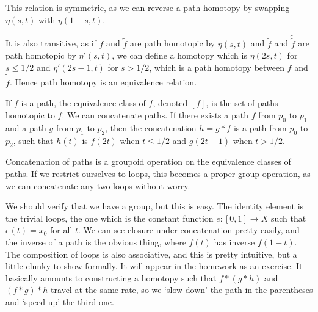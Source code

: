  This relation is symmetric, as we can reverse a path homotopy by swapping $\eta(s,t)$ with $\eta(1-s,t)$.
 
 It is also transitive, as if $f$ and $\tilde{f}$ are path homotopic by $\eta(s,t)$ and $\tilde{f}$ and $\tilde{\tilde{f}}$ are path homotopic by $\eta'(s,t)$, we can define a homotopy which is $\eta(2s,t)$ for $s\leq 1/2$ and $\eta'(2s-1,t)$ for $s>1/2$, which is a path homotopy between $f$ and $\tilde{\tilde{f}}$.  Hence path homotopy is an equivalence relation.
 
 If $f$ is a path, the equivalence class of $f$, denoted $[f]$, is the set of paths homotopic to $f$.  We can concatenate paths.  If there exists a path $f$ from $p_0$ to $p_1$ and a path $g$ from $p_1$ to $p_2$, then the concatenation $h=g\ast f$ is a path from $p_0$ to $p_2$, such that $h(t)$ is $f(2t)$ when $t\leq 1/2$ and $g(2t-1)$ when $t>1/2$.
 
 Concatenation of paths is a groupoid operation on the equivalence classes of paths.  If we restrict ourselves to loops, this becomes a proper group operation, as we can concatenate any two loops without worry.
 
 We should verify that we have  a group, but this is easy.  The identity element is the trivial loops, the one which is the constant function $e:[0,1]\rightarrow X$ such that $e(t)=x_0$ for all $t$.  We can see closure under concatenation pretty easily, and the inverse of a path is the obvious thing, where $f(t)$ has inverse $f(1-t)$.  The composition of loops is also associative, and this is pretty intuitive, but a little clunky to show formally.  It will appear in the homework as an exercise.  It basically amounts to constructing a homotopy such that $f\ast(g\ast h)$ and $(f\ast g)\ast h$ travel at the same rate, so we `slow down' the path in the parentheses and `speed up' the third one.
 
